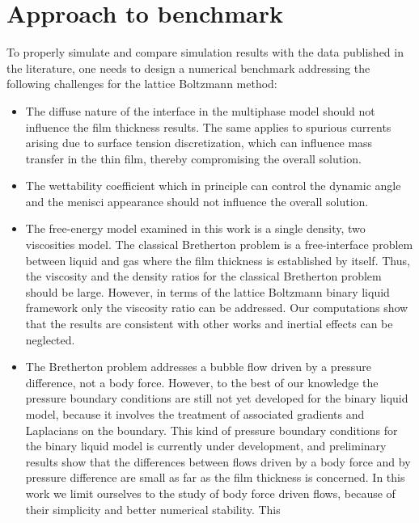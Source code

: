\documentclass[preprint,12pt]{elsarticle}
\begin{document}
\section{Approach to benchmark}
To properly simulate and compare simulation results with the data
published in the literature, one needs to design a numerical benchmark addressing
the following challenges for the lattice Boltzmann method:
\begin{itemize}
 \item The diffuse nature of the interface in the multiphase model should not
influence the film thickness results.  The same applies to spurious
currents arising due to surface tension discretization, which
can influence mass transfer in the thin film, thereby compromising the
overall solution. 
 \item The wettability coefficient which in principle can control the
dynamic angle and the menisci appearance \cite{pagonabarraga-finger} should not
influence the overall solution.
 \item The free-energy model examined in this work is a single density, two
viscosities model. The classical Bretherton problem is a free-interface problem between liquid and
gas
where the film thickness is established by itself. Thus, the viscosity and the density ratios for
the
classical
Bretherton problem should
be large. However, in terms of the lattice Boltzmann binary liquid framework only the viscosity
ratio can be addressed. Our computations show that the results are consistent with other works and
inertial effects can be neglected.
  \item The Bretherton problem addresses a bubble flow driven by a pressure
difference, not a body force. However, to the best of our knowledge the pressure boundary
conditions are still not yet developed for the binary liquid model, because it involves the
treatment of associated gradients and Laplacians on the boundary.
This kind of pressure boundary conditions for the binary liquid model is currently
under development, and preliminary results show that the differences between flows driven by a body
force and by
pressure difference are small as far as the film
 thickness is concerned.  In this work we limit ourselves to the study
of body force driven flows, because of their simplicity and better numerical stability. This

\end{itemize}
\end{document}
